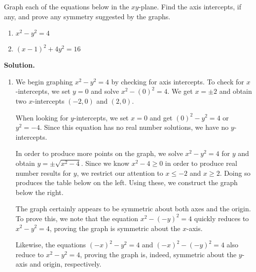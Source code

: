 \begin{ex}  \label{graphssymmex} Graph each of the equations below in the $xy$-plane.  Find the axis intercepts, if any,  and prove any symmetry suggested by the graphs.  

\begin{multicols}{2}

\begin{enumerate}

\item $x^2-y^2 = 4$

\item $(x-1)^2+4y^2 = 16$

\end{enumerate}

\end{multicols}


{\bf Solution.}

\begin{enumerate}

\item We begin graphing $x^2-y^2 = 4$ by checking for axis intercepts.  To check for $x$-intercepts, we set $y=0$ and solve $x^2 - (0)^2 = 4$.  We get $x = \pm 2$ and obtain two $x$-intercepts $(-2,0)$ and $(2,0)$.  

\smallskip

When looking for $y$-intercepts, we set $x=0$ and get $(0)^2 - y^2 = 4$ or $y^2 = -4$.  Since this equation has no real number solutions, we have no $y$-intercepts.  

\smallskip

In order to produce more points on the graph, we solve $x^2-y^2 = 4$ for $y$ and obtain $y = \pm \sqrt{x^2-4}$.  Since we know $x^2-4 \geq 0$ in order to produce real number results for $y$, we restrict our attention to $x \leq -2$ and $x \geq 2$.  Doing so produces the table below on the left.  Using these, we construct the graph below the right.

\smallskip

The graph certainly appears to be symmetric about both axes and the origin.  To prove this, we note that the equation $x^2-(-y)^2 = 4$ quickly reduces to $x^2-y^2 = 4$, proving the graph is symmetric about the $x$-axis. 

\smallskip

 Likewise, the equations $(-x)^2-y^2 = 4$ and $(-x)^2-(-y)^2 = 4$ also reduce to $x^2-y^2 = 4$, proving the graph is, indeed, symmetric about the $y$-axis and origin, respectively.


\end{enumerate}
\end{ex}
